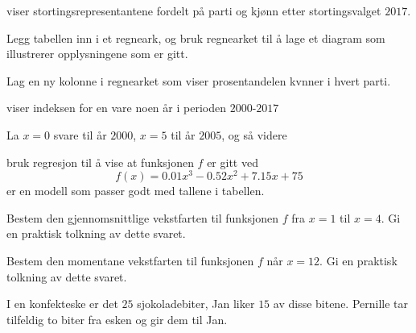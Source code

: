  viser stortingsrepresentantene fordelt på parti og
kjønn etter stortingsvalget $2017$.

\begin{oppgaver}
   Legg tabellen inn i et regneark, og bruk regnearket til å lage et
    diagram som illustrerer opplysningene som er gitt.
\end{oppgaver}

\begin{oppgaver}
   Lag en ny kolonne i regnearket som viser prosentandelen kvnner i
    hvert parti.
\end{oppgaver}


\Oppgave[6]

viser indeksen for en vare noen år i perioden $2000$-$2017$

La $x=0$ svare til år $2000$, $x=5$ til år $2005$, og så videre

\begin{oppgaver}
   bruk regresjon til å vise at funksjonen $f$ er gitt ved
  \begin{equation*}
    f(x) = \num{0.01} x^3 - \num{0.52}x^2 + \num{7.15}x + 75
  \end{equation*}
  er en modell som passer godt med tallene i tabellen.
\end{oppgaver}

\begin{oppgaver}
   Bestem den gjennomsnittlige vekstfarten til funksjonen $f$ fra
    $x = 1$ til $x = 4$.  Gi en praktisk tolkning av dette svaret.
\end{oppgaver}

\begin{oppgaver}
   Bestem den momentane vekstfarten til funksjonen $f$ når $x = 12$.
    Gi en praktisk tolkning av dette svaret.
\end{oppgaver}


\Oppgave[4]

I en konfekteske er det $25$ sjokoladebiter, Jan liker $15$ av disse bitene.
Pernille tar tilfeldig to biter fra esken og gir dem til Jan.

